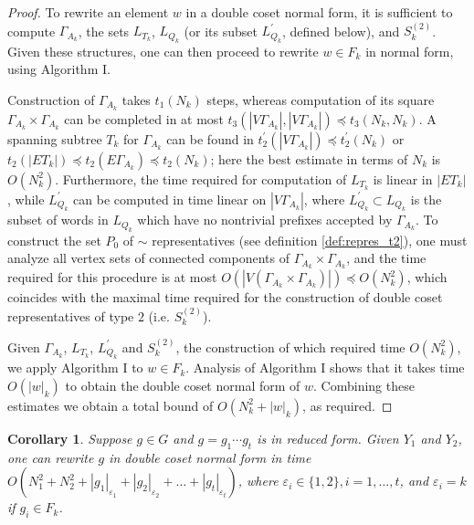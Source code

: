 \documentclass[a4paper,12pt]{article}
\newcommand{\G}{\Gamma }
\newcommand{\e}{\varepsilon }
\newtheorem{corollary}[theorem]{Corollary}
\numberwithin{equation}{section}
\numberwithin{figure}{section}
\begin{document}
\begin{proof}
To rewrite an element $w$ in a double coset normal form, it is
sufficient to compute $\G_{A_k}$, the sets $L_{T_k}$, $L_{Q_k}$ (or
its subset $L^{\prime}_{Q_k}$, defined below), and
$S^{(2)}_k$. Given these structures, one can then proceed to rewrite $w \in
F_k$ in normal form, using Algorithm I.

Construction of $\G_{A_k}$ takes  $t_1(N_k)$ steps, whereas
computation of its square
 $\G_{A_k} \times \G_{A_k}$ can be completed in at most
 $t_3(|V\G_{A_k}|,|V\G_{A_k}|) \preceq t_3(N_k,N_k)$.
A spanning subtree $T_k$ for $\G_{A_k}$ can be found in
$t^{\prime}_2(|V\G_{A_k}|) \preceq t^{\prime}_2(N_k)$ or $t_2(|E
T_k|) \preceq t_2(E\G_{A_k}) \preceq t_2(N_k)$; here the best
estimate in terms of $N_k$ is $O(N_k^2)$. Furthermore, the time
required for computation of $L_{T_k}$ is linear in $|E T_k|$, while
$L^{\prime}_{Q_k}$ can be computed in time linear on
$|V\G_{A_k}|$, where $L^{\prime}_{Q_k} \subset L_{Q_k}$ is the 
subset of words in $L_{Q_k}$ which have no nontrivial prefixes
accepted by $\G_{A_k}$. To construct the set $P_0$ of $\sim$
representatives (see definition \ref{def:repres_t2}), one must 
analyze all vertex sets of connected components of $\G_{A_k} 
\times \G_{A_k}$, and the time  required for this procedure is at
most $O(|V(\G_{A_k} \times \G_{A_k})|) \preceq O(N^2_k)$, which
coincides with the maximal time required for the construction of double
coset representatives of type $2$ (i.e. $S^{(2)}_k$).

Given $\G_{A_k}$, $L_{T_k}$, $L^{\prime}_{Q_k}$ and $S^{(2)}_k$, 
the construction of which required time 
 $O(N^2_k)$, 
 we apply Algorithm I to $w \in F_k$. Analysis
of Algorithm I shows that it takes time  $O(|w|_k)$  to obtain
the double coset normal form of $w$. Combining these estimates
 we obtain a total bound of $O(N^2_k + |w|_k)$, as required.
\end{proof}

\begin{corollary}\label{cor:dcnf_time} Suppose $g \in G$ and $g=g_1 \cdots g_t$ is in reduced
form. Given $Y_1$ and $Y_2$, one can rewrite $g$ in double coset normal
form in time  $O(N^2_1+ N^2_2 + |g_1|_{\e_1}+|g_2|_{\e_2}+
\ldots +|g_t|_{\e_t})$, where $\e_i \in \{ 1, 2\}, i = 1, \ldots,
t$, and $\e_i = k$ if $g_i \in F_k$.
\end{corollary}
\end{document}
